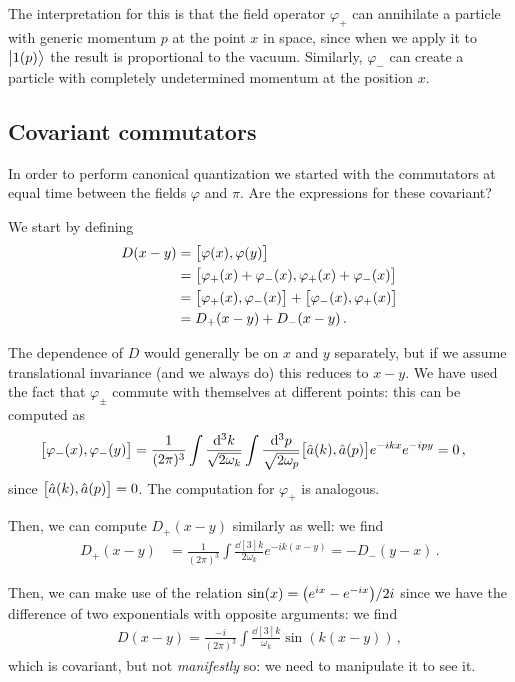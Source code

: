 \documentclass[main.tex]{subfiles}
\begin{document}
The interpretation for this is that the field operator \(\varphi_{+}\) can annihilate a particle with generic momentum \(p\) at the point \(x\) in space, since when we apply it to \(\ket{1(p)}\) the result is proportional to the vacuum. Similarly, \(\varphi_{-}\) can create a particle with completely undetermined momentum at the position \(x\). 

\subsection{Covariant commutators} \label{sec:covariant-commutators}

In order to perform canonical quantization we started with the commutators at equal time between the fields \(\varphi \) and \(\pi \). 
Are the expressions for these covariant? 

We start by defining 
%
\begin{subequations}
\begin{align}
D(x - y) &= \qty[\varphi (x), \varphi (y)]  \\
&= \qty[\varphi_{+} (x) + \varphi_{-} (x), \varphi_{+} (x) + \varphi_{-} (x)]  \\
&= \qty[\varphi_{+} (x), \varphi_{-} (x)] + \qty[\varphi_{-} (x), \varphi_{+} (x)]  \\
&= D_+ (x-y) + D_- (x-y)
\,.
\end{align}
\end{subequations}


The dependence of \(D\) would generally be on \(x\) and \(y\) separately, but if we assume translational invariance (and we always do) this reduces to \(x-y\).
We have used the fact that \(\varphi_{\pm}\) commute with themselves at different points: this can be computed as 
%
\begin{align}
\qty[\varphi_{-}(x) , \varphi_{-}(y)] &=
\frac{1}{(2\pi )^{3}} \int \frac{ \dd[3]{k}}{\sqrt{2 \omega_{k}}}
\int \frac{\dd[3]{p}}{\sqrt{2 \omega_{p}}} 
\qty[\hat{a}(k), \hat{a}(p)] e^{-ikx} e^{-ipy} = 0
\,,
\end{align}
%
since \(\qty[\hat{a}(k), \hat{a}(p)] = 0\). The computation for \(\varphi_{+}\) is analogous. 

Then, we can compute \(D_{+} (x-y)\) similarly as well: we find 
%
\begin{align}
D_{+} (x-y) &= \frac{1}{(2\pi )^3} \int \frac{ \dd[3]{k} }{2 \omega_{k}}
e^{-ik(x-y)} = - D_{-} (y-x)  
\,.
\end{align}

Then, we can make use of the relation \(\sin(x) = \qty(e^{ix} - e^{-ix}) / 2i\) since we have the difference of two exponentials with opposite arguments: we find 
%
\begin{align}
D(x-y) = \frac{-i}{(2 \pi )^3}
\int \frac{ \dd[3]{k}}{\omega_{k}} \sin(k (x-y))
\,,
\end{align}
%
which is covariant, but not \emph{manifestly} so: we need to manipulate it to see it.
\end{document}
